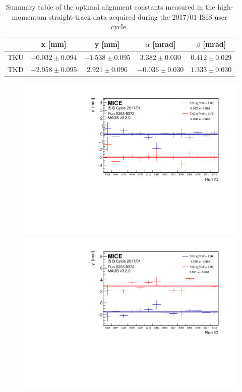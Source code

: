 \begin{table}[ht!]
	\centering
		\begin{tabular}{l|c|c|c|c}
			& x [mm] & y [mm] & $\alpha$ [mrad] & $\beta$ [mrad] \\
			\hline
			TKU & $-0.032\pm0.094$ & $-1.538\pm0.095$ & $ 3.382\pm0.030$ & $0.412\pm0.029$ \\
			TKD & $-2.958\pm0.095$ & $ 2.921\pm0.096$ & $-0.036\pm0.030$ & $1.333\pm0.030$
		\end{tabular}
	\caption{Summary table of the optimal alignment constants measured in the high-momentum straight-track data acquired during the 2017/01 ISIS user cycle.}
	\label{tab:201701_constants}
\end{table}

\begin{figure} [!htb]
	\centering
	\begin{minipage}[b]{.49\textwidth}
		\centering
		\includegraphics[width=\textwidth]{data_final/x_bestfit.pdf}
	\end{minipage}
	\hfill
	\begin{minipage}[b]{.49\textwidth}
		\centering
		\includegraphics[width=\textwidth]{data_final/y_bestfit.pdf}
	\end{minipage}
	

\end{figure}
